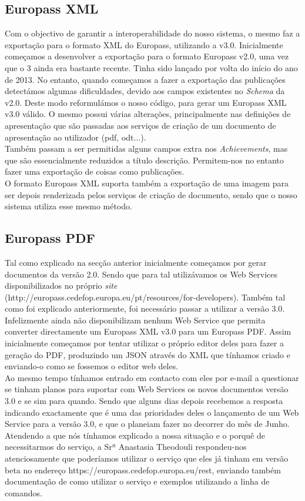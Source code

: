 \documentclass[a4paper,11pt,openright,openbib]{article}
\begin{document}
\subsection{Europass XML}
Com o objectivo de garantir a interoperabilidade do nosso sistema, o mesmo faz a exportação para o formato XML do Europass, utilizando a v3.0. Inicialmente começamos a desenvolver a exportação para o formato Europass v2.0, uma vez que o 3 ainda era bastante recente. Tinha sido lançado por volta do início do ano de 2013. No entanto, quando começamos a fazer a exportação das publicações detectámos algumas dificuldades, devido aos campos existentes no \emph{Schema} da v2.0. Deste modo reformulámos o nosso código, para gerar um Europass XML v3.0 válido. O mesmo possui várias alterações, principalmente nas definições de apresentação que são passadas aos serviços de criação de um documento de apresentação ao utilizador (pdf, odt...).\\
Também passam a ser permitidas alguns campos extra nos \emph{Achievements}, mas que são essencialmente reduzidos a título descrição. Permitem-nos no entanto fazer uma exportação de coisas como publicações.\\
O formato Europass XML suporta também a exportação de uma imagem para ser depois renderizada pelos serviços de criação de documento, sendo que o nosso sistema utiliza esse mesmo método.
\subsection{Europass PDF}
Tal como explicado na secção anterior inicialmente começamos por gerar documentos da versão 2.0. Sendo que para tal utilizávamos os Web Services disponibilizados no próprio \emph{site} (http://europass.cedefop.europa.eu/pt/resources/for-developers). Também tal como foi explicado anteriormente, foi necessário passar a utilizar a versão 3.0. Infelizmente ainda não disponibilizam nenhum Web Service que permita converter directamente um Europass XML v3.0 para um Europass PDF. Assim inicialmente começamos por tentar utilizar o próprio editor deles para fazer a geração do PDF, produzindo um JSON através do XML que tínhamos criado e enviando-o como se fossemos o editor web deles.\\
Ao mesmo tempo tínhamos entrado em contacto com eles por e-mail a questionar se tinham planos para suportar com Web Services os novos documentos versão 3.0 e se sim para quando. Sendo que alguns dias depois recebemos a resposta indicando exactamente que é uma das prioridades deles o lançamento de um Web Service para a versão 3.0, e que o planeiam fazer no decorrer do mês de Junho. Atendendo a que nós tínhamos explicado a nossa situação e o porquê de necessitarmos do serviço, a Srª Anastasia Theodouli respondeu-nos atenciosamente que poderíamos utilizar o serviço que eles já tinham em versão beta no endereço https://europass.cedefop.europa.eu/rest, enviando também documentação de como utilizar o serviço e exemplos utilizando a linha de comandos.
\end{document}
